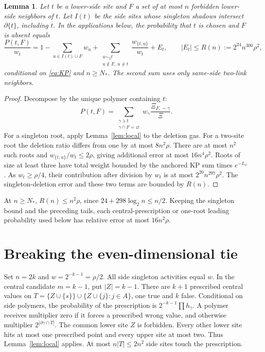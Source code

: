\documentclass[11pt]{article}
\newtheorem{lemma}[theorem]{Lemma}
\theoremstyle{remark}\newtheorem{remark}[theorem]{Remark}
\begin{document}
\begin{lemma}\label{lem:root}
Let $t$ be a lower-side site and $F$ a set of at most $n$ forbidden
lower-side neighbors of $t$. Let $I(t)$ be the side sites whose singleton
shadows intersect $\partial\{t\}$, including $t$. In the applications
below, the probability that $t$ is chosen and $F$ is absent equals
\begin{equation}\label{eq:root}
 \frac{P(t,F)}{w_t}
 =1-\sum_{u\in I(t)\cup F}w_u
   +\sum_{\substack{u\sim_2t\\u\notin F,\ u\ne t}}
       \frac{w_{\{t,u\}}}{w_t}+E_t,
 \qquad |E_t|\le R(n):=2^{24}n^{300}\rho^2,
\end{equation}
conditional on \eqref{eq:KP} and $n\ge N_*$. The second sum uses only
same-side two-link neighbors.
\end{lemma}
\begin{proof}
Decompose by the unique polymer containing $t$:
\[
 P(t,F)=\sum_{\substack{\gamma\ni t\\\gamma\cap F=\varnothing}}
      w_\gamma\frac{\Xi_{F,\sim\gamma}}{\Xi}.
\]
For a singleton root, apply Lemma~\ref{lem:local} to the deletion gas.
For a two-site root the deletion ratio differs from one by at most
$8n^2\rho$. There are at most $n^2$ such roots and
$w_{\{t,u\}}/w_t\le2\rho$, giving additional error at most
$16n^4\rho^2$. Roots of size at least three have total weight bounded
by the anchored KP sum times $e^{-L_3}$. As
$w_t\ge\rho/4$, their contribution after division by $w_t$ is at most
$2^{20}n^{297}\rho^2$. The singleton-deletion error and these two
terms are bounded by $R(n)$.
\end{proof}

At $n\ge N_*$, $R(n)\le n^2\rho$, since
$24+298\log_2n\le n/2$. Keeping the singleton bound and the preceding
tails, each central-prescription or one-root leading probability used
below has relative error at most $16n^2\rho$.

\section{Breaking the even-dimensional tie}\label{sec:even}
Set $n=2k$ and $w=2^{-k-1}=\rho/2$. All side singleton activities equal
$w$. In the central candidate $m=k-1$, put $|Z|=k-1$. There are
$k+1$ prescribed central values on
$T=\{Z\cup\{s\}\}\cup\{Z\cup\{j\}:j\in A\}$, one true and $k$ false.
Conditional on side polymers, the probability of the prescription is
$2^{-k-1}\prod h_\gamma$. A polymer receives multiplier zero if it
forces a prescribed wrong value, and otherwise multiplier
$2^{|\partial\gamma\cap T|}$. The common lower site $Z$ is forbidden.
Every other lower site hits at most one prescribed point and every upper
site at most two. Thus Lemma~\ref{lem:local} applies. At most
$n|T|\le2n^2$ side sites touch the prescription.
\end{document}

